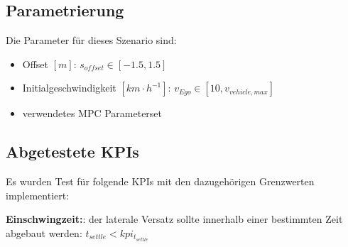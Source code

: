 \subsection{Parametrierung}
Die Parameter für dieses Szenario sind:
\begin{itemize}
    \item Offset $[m]$: $s_{offset} \in [-1.5,1.5]$ 
    \item Initialgeschwindigkeit $[km\cdot h^{-1}]$: $v_{Ego} \in [10,v_{vehicle,max}]$
    \item verwendetes MPC Parameterset 
\end{itemize}

\subsection{Abgetestete KPIs}
Es wurden Test für folgende KPIs mit den dazugehörigen Grenzwerten implementiert:

\medskip\noindent\textbf{Einschwingzeit:}: der laterale Versatz sollte innerhalb einer bestimmten Zeit abgebaut werden: $t_{settle} < kpi_{t_{settle}}$

